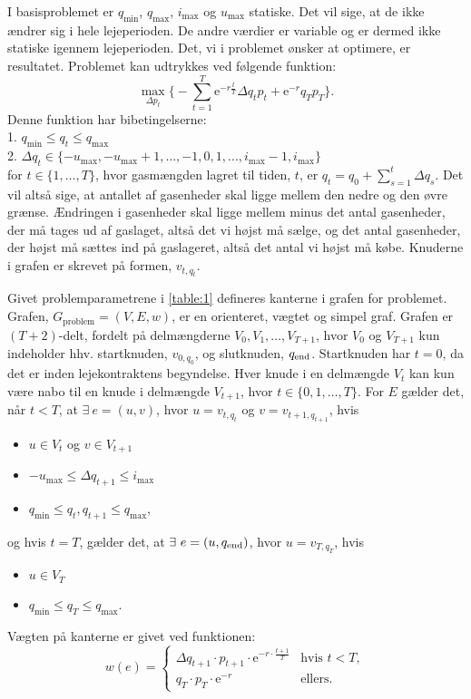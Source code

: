 I basisproblemet er $q_{\min}$, $q_{\max}$, $i_{\max}$ og $u_{\max}$ statiske. Det vil sige, at de ikke ændrer sig i hele lejeperioden. De andre værdier er variable og er dermed ikke statiske igennem lejeperioden. Det, vi i problemet ønsker at optimere, er resultatet. Problemet kan udtrykkes ved følgende funktion:
\begin{equation}
\max_{\Delta p_{t}} \Bigg\{ -\sum_{t=1}^{T} \mathrm{e}^{-r\frac{t}{T}} \Delta q_{t} p_{t}+ \mathrm{e}^{-r}q_{T}p_{T} \Bigg\}.
\end{equation}
Denne funktion har bibetingelserne:\\
1. $q_{\min} \leq q_{t} \leq q_{\max}$\\
2. $\Delta q_{t} \in \{-u_{\max},-u_{\max}+1,\dotsc,-1,0,1,\dotsc,i_{\max}-1,i_{\max} \}$ \\
for $t \in \{1,\dotsc,T\}$, hvor gasmængden lagret til tiden, $t$, er $q_{t}=q_{0}+\sum_{s=1}^{t} \Delta q_{s}$.
Det vil altså sige, at antallet af gasenheder skal ligge mellem den nedre og den øvre grænse. Ændringen i gasenheder skal ligge mellem minus det antal gasenheder, der må tages ud af gaslaget, altså det vi højst må sælge, og det antal gasenheder, der højst må sættes ind på gaslageret, altså det antal vi højst må købe.
Knuderne i grafen er skrevet på formen, $v_{t,q_t}$.

\begin{defn} [Problemgraf] \label{defn:graf_problem}
Givet problemparametrene i \autoref{table:1} defineres kanterne i grafen for problemet. Grafen, $G_{\textrm{problem}}=(V,E,w)$, er en orienteret, vægtet og simpel graf. Grafen er $(T+2)$-delt, fordelt på delmængderne $V_0,V_1, \dotsc, V_{T+1}$, hvor $V_0$ og $V_{T+1}$ kun indeholder hhv. startknuden, $v_{0,q_0}$, og slutknuden, $q_{\textrm{end}}$. Startknuden har $t=0$, da det er inden lejekontraktens begyndelse. Hver knude i en delmængde $V_t$ kan kun være nabo til en knude i delmængde $V_{t+1}$, hvor $t \in \{0,1, \dotsc,T\}$.
For $E$ gælder det, når $t<T$, at $\exists \ e = (u,v)$, hvor $u=v_{t,q_t}$ og $v=v_{t+1, q_{t+1}}$, hvis
	\begin{itemize}
	\item $u \in V_t$ og $v \in V_{t+1}$
	\item $-u_{\max} \leq \Delta q_{t+1} \leq i_{\max}$
	\item $q_{\min} \leq q_t, q_{t+1} \leq q_{\max}$,
	\end{itemize}
og hvis $t=T$, gælder det, at $\exists \ e=(u,q_{\slut})$, hvor $u=v_{T,q_T}$, hvis
	\begin{itemize}
	\item $u \in V_T$
	\item $q_{\min} \leq q_{T} \leq q_{\max}$.
	\end{itemize}
Vægten på kanterne er givet ved funktionen:
\begin{equation}
w(e)=
	\begin{cases}
	\Delta q_{t+1} \cdot p_{t+1} \cdot \textrm{e}^{-r \cdot \frac{t+1}{T}} &\text{hvis } t < T, \\
	q_T \cdot p_T \cdot \textrm{e}^{-r} & \text{ellers.}
	\end{cases}
\end{equation}

\end{defn}
